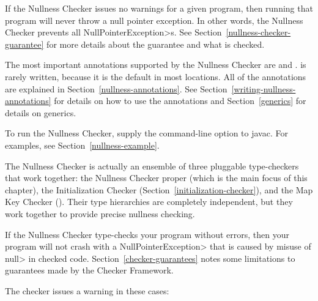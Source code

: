 \htmlhr
{}

If the Nullness Checker issues no warnings for a given program, then
running that program will never throw a null pointer exception.  In
other words, the Nullness Checker prevents all \<NullPointerException>s.
See Section~\ref{nullness-checker-guarantee} for more details about
the guarantee and what is checked.

The most important annotations supported by the Nullness Checker are
 and
.
 is rarely written, because it is
the default in most locations.  All of the annotations are explained in
Section~\ref{nullness-annotations}.
See Section~\ref{writing-nullness-annotations} for details on how to
use the annotations and Section~\ref{generics} for details on
generics.

To run the Nullness Checker, supply the
command-line option to javac.  For
examples, see Section~\ref{nullness-example}.

The Nullness Checker is actually an ensemble of three pluggable
type-checkers that work together: the Nullness Checker proper (which is the
main focus of this chapter), the Initialization Checker
(Section~\ref{initialization-checker}), and the Map Key Checker
().
Their type hierarchies are completely independent, but they work together
to provide precise nullness checking.




If the Nullness Checker type-checks your program without errors, then your
program will not crash with a \<NullPointerException> that is caused by
misuse of \<null> in checked code.
%
Section~\ref{checker-guarantees} notes some limitations to guarantees made
by the Checker Framework.

The checker issues a warning in these cases:

